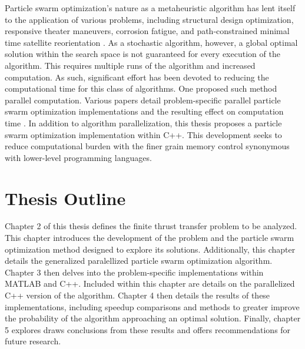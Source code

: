 Particle swarm optimization's nature as a metaheuristic algorithm has lent itself to the application of various problems,
including structural design optimization, responsive theater maneuvers, corrosion fatigue, and path-constrained minimal time satellite reorientation
\citep{PSO1, PSO2, PSO3, PSO4}. As a stochastic algorithm, however, a global optimal solution within the search space is not guaranteed for every execution of the algorithm. 
This requires multiple runs of the algorithm and increased computation. As such, significant effort has been devoted to reducing the computational time for this class of
algorithms. One proposed such method parallel computation. Various papers detail problem-specific parallel particle swarm optimization implementations and the resulting 
effect on computation time \citep{PPSO1, PPSO2, PPSO3}. In addition to algorithm parallelization, this thesis proposes a particle swarm optimization implementation within C++.
This development seeks to reduce computational
burden with the finer grain memory control synonymous with lower-level programming languages. 


\section{Thesis Outline}

Chapter 2 of this thesis defines the finite thrust transfer problem to be analyzed. This chapter introduces the development of the problem
and the particle swarm optimization method designed to explore its solutions. Additionally, this chapter details the generalized paralellized particle swarm optimization algorithm.
Chapter 3 then delves into the problem-specific implementations within MATLAB and C++. Included within
this chapter are details on the parallelized C++ version of the algorithm. 
Chapter 4 then details the results of these implementations, including speedup comparisons and methods to greater improve the probability of the algorithm approaching an optimal solution.
Finally, chapter 5 explores draws conclusions from these results and offers recommendations for future research. 